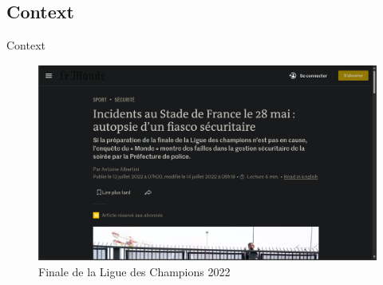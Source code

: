 \documentclass[aspectratio=1610]{beamer}
\begin{document}
    \subsection{Context}
    \begin{frame}{Context}
        \begin{figure}[H]
            \centering
            \includegraphics[height=6.5cm]{./images/EX1/CSC_5RO08_TA_EX1_news.png}
            \caption{Finale de la Ligue des Champions 2022}
        \end{figure}
    \end{frame}
\end{document}
